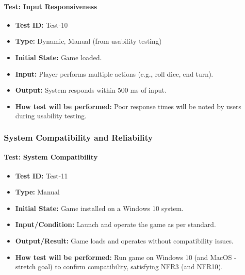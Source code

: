 \documentclass[12pt, titlepage]{article}
\begin{document}
\paragraph{\label{test-10}Test: Input Responsiveness}
\begin{itemize}
    \item \textbf{Test ID:} Test-10
    \item \textbf{Type:} Dynamic, Manual (from usability testing)
    \item \textbf{Initial State:} Game loaded.
    \item \textbf{Input:} Player performs multiple actions (e.g., roll dice, end turn).
    \item \textbf{Output:} System responds within 500 ms of input.
    \item \textbf{How test will be performed:} Poor response times will be noted by users during usability testing.
\end{itemize}

\subsubsection{System Compatibility and Reliability}

\paragraph{\label{test-11}Test: System Compatibility}
\begin{itemize}
    \item \textbf{Test ID:} Test-11
    \item \textbf{Type:} Manual
    \item \textbf{Initial State:} Game installed on a Windows 10 system.
    \item \textbf{Input/Condition:} Launch and operate the game as per standard.
    \item \textbf{Output/Result:} Game loads and operates without compatibility issues.
    \item \textbf{How test will be performed:} Run game on Windows 10 (and MacOS - stretch goal) to confirm compatibility, satisfying NFR3 (and NFR10).
\end{itemize}
\end{document}
